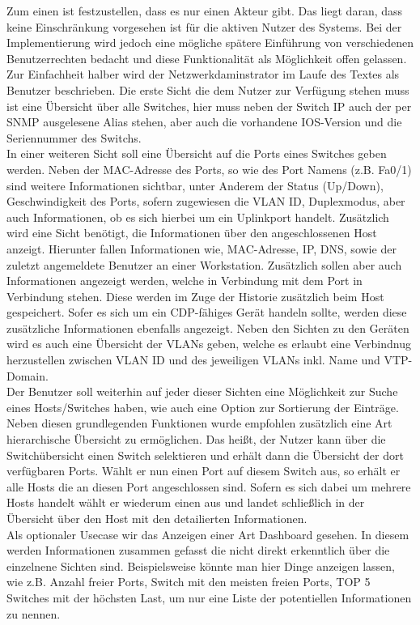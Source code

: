 Zum einen ist festzustellen, dass es nur einen Akteur gibt. Das liegt daran, dass keine Einschränkung vorgesehen ist für die aktiven Nutzer des Systems. Bei der Implementierung wird jedoch eine mögliche spätere Einführung von verschiedenen Benutzerrechten bedacht und diese Funktionalität als Möglichkeit offen gelassen. Zur Einfachheit halber wird der Netzwerkdaminstrator im Laufe des Textes als Benutzer beschrieben.
Die erste Sicht die dem Nutzer zur Verfügung stehen muss ist eine Übersicht über alle Switches, hier muss neben der Switch IP auch der per SNMP ausgelesene Alias stehen, aber auch die vorhandene IOS-Version und die Seriennummer des Switchs.\\
In einer weiteren Sicht soll eine Übersicht auf die Ports eines Switches geben werden.
Neben der MAC-Adresse des Ports, so wie des Port Namens (z.B. Fa0/1) sind weitere Informationen sichtbar, unter Anderem der Status (Up/Down), Geschwindigkeit des Ports, sofern zugewiesen die VLAN ID, Duplexmodus, aber auch Informationen, ob es sich hierbei um ein Uplinkport handelt.
Zusätzlich wird eine Sicht benötigt, die Informationen über den angeschlossenen Host anzeigt. Hierunter fallen Informationen wie, MAC-Adresse, IP, DNS, sowie der zuletzt angemeldete Benutzer an einer Workstation. Zusätzlich sollen aber auch Informationen angezeigt werden, welche in Verbindung mit dem Port in Verbindung stehen. Diese werden im Zuge der Historie zusätzlich beim Host gespeichert. Sofer es sich um ein CDP-fähiges Gerät handeln sollte, werden diese zusätzliche Informationen ebenfalls angezeigt.
Neben den Sichten zu den Geräten wird es auch eine Übersicht der VLANs geben, welche es erlaubt eine Verbindnug herzustellen zwischen VLAN ID und des jeweiligen VLANs inkl. Name und  VTP-Domain.\\
Der Benutzer soll weiterhin auf jeder dieser Sichten eine Möglichkeit zur Suche eines Hosts/Switches haben, wie auch eine Option zur Sortierung der Einträge.
Neben diesen grundlegenden Funktionen wurde empfohlen zusätzlich eine Art hierarchische Übersicht zu ermöglichen. Das heißt, der Nutzer kann über die Switchübersicht einen Switch selektieren und erhält dann die Übersicht der dort verfügbaren Ports. Wählt er nun einen Port auf diesem Switch aus, so erhält er alle Hosts die an diesen Port angeschlossen sind. Sofern es sich dabei um mehrere Hosts handelt wählt er wiederum einen aus und landet schließlich in der Übersicht über den Host mit den detailierten Informationen.\\
Als optionaler Usecase wir das Anzeigen einer Art Dashboard gesehen. In diesem werden Informationen zusammen gefasst die nicht direkt erkenntlich über die einzelnene Sichten sind. Beispielsweise könnte man hier Dinge anzeigen lassen, wie z.B. Anzahl freier Ports, Switch mit den meisten freien Ports, TOP 5 Switches mit der höchsten Last, um nur eine Liste der potentiellen Informationen zu nennen.

